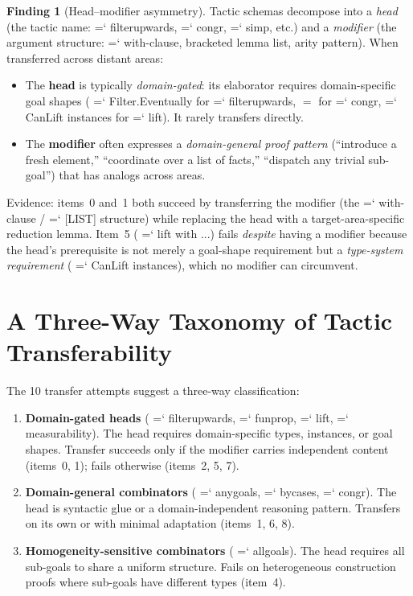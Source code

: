 \documentclass[11pt]{article}
\renewcommand{\texttt}[1]{%
  \begingroup\ttfamily\hyphenchar\font=`\-\relax
  \def\_{\textunderscore\discretionary{}{}{}}%
  #1\endgroup}
\theoremstyle{definition}
\newtheorem{finding}[theorem]{Finding}
\theoremstyle{remark}
\begin{document}
\begin{finding}[Head--modifier asymmetry]\label{find:headmod}
Tactic schemas decompose into a \emph{head} (the tactic name:
\texttt{filter\_upwards}, \texttt{congr}, \texttt{simp}, etc.)
and a \emph{modifier} (the argument structure: \texttt{with}-clause,
bracketed lemma list, arity pattern).  When transferred across
distant areas:
\begin{itemize}
\item The \textbf{head} is typically \emph{domain-gated}: its
  elaborator requires domain-specific goal shapes
  (\texttt{Filter.Eventually} for \texttt{filter\_upwards},
  $=$ for \texttt{congr}, \texttt{CanLift} instances for
  \texttt{lift}).  It rarely transfers directly.
\item The \textbf{modifier} often expresses a \emph{domain-general
  proof pattern} (``introduce a fresh element,'' ``coordinate over
  a list of facts,'' ``dispatch any trivial sub-goal'') that has
  analogs across areas.
\end{itemize}
\end{finding}

Evidence: items~0 and~1 both succeed by transferring the modifier
(the \texttt{with}-clause / \texttt{[LIST]} structure) while replacing
the head with a target-area-specific reduction lemma.  Item~5
(\texttt{lift with ...}) fails \emph{despite} having a modifier
because the head's prerequisite is not merely a goal-shape requirement
but a \emph{type-system requirement} (\texttt{CanLift} instances),
which no modifier can circumvent.

\section{A Three-Way Taxonomy of Tactic Transferability}\label{sec:taxonomy}

The 10 transfer attempts suggest a three-way classification:

\begin{enumerate}
\item \textbf{Domain-gated heads} (\texttt{filter\_upwards},
  \texttt{fun\_prop}, \texttt{lift}, \texttt{measurability}).
  The head requires domain-specific types, instances, or goal shapes.
  Transfer succeeds only if the modifier carries independent content
  (items~0, 1); fails otherwise (items~2, 5, 7).

\item \textbf{Domain-general combinators} (\texttt{any\_goals},
  \texttt{by\_cases}, \texttt{congr}).  The head is syntactic glue
  or a domain-independent reasoning pattern.  Transfers on its own
  or with minimal adaptation (items~1, 6, 8).

\item \textbf{Homogeneity-sensitive combinators} (\texttt{all\_goals}).
  The head requires all sub-goals to share a uniform structure.
  Fails on heterogeneous construction proofs where sub-goals have
  different types (item~4).
\end{enumerate}
\end{document}
